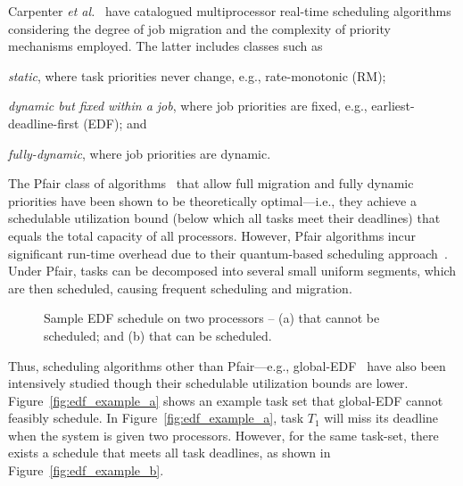 \documentclass[12pt,dvips]{report}
\begin{document}
Carpenter \textit{et al.}~\cite{Carpenter04acategorization} have catalogued
multiprocessor real-time scheduling algorithms considering the
degree of job migration and the complexity of priority mechanisms
employed. The latter includes classes such as
\begin{inparaenum}[(1)] \item \textit{static}, where task priorities never change, e.g., rate-monotonic (RM); \item
\textit{dynamic but fixed within a job}, where job priorities are
fixed, e.g., earliest-deadline-first (EDF); and \item
\textit{fully-dynamic}, where job priorities are dynamic.
\end{inparaenum}

The Pfair class of algorithms~\cite{pfair1} that allow full
migration and fully dynamic priorities have been shown to be
theoretically optimal---i.e., they achieve a schedulable
utilization bound (below which all tasks meet their deadlines)
that equals the total capacity of all processors. However, Pfair
algorithms incur significant run-time overhead due to their
quantum-based scheduling approach~\cite{devi_tardiness,shab03}. Under Pfair,
tasks can be decomposed into several small uniform segments, which
are then scheduled, causing frequent scheduling and migration.

\begin{figure}[htbp]%
\centering 
    \hspace{40pt}
\caption{Sample EDF schedule on two processors -- (a) that cannot be scheduled; and (b) that can be scheduled.}
\label{fig:edf_example}
\end{figure}

Thus, scheduling algorithms other than Pfair---e.g., global-EDF~\cite{GEDF, Baruah-gnpedf, anderson_pedf} have also been intensively
studied though their schedulable utilization bounds are lower.
Figure~\ref{fig:edf_example_a} shows an example task set that
global-EDF cannot feasibly schedule. In Figure~\ref{fig:edf_example_a}, task $T_1$ will miss
its deadline when the system is given two processors. However, for the same task-set,
there exists a schedule that meets all task deadlines, as shown in Figure~\ref{fig:edf_example_b}.
\end{document}
